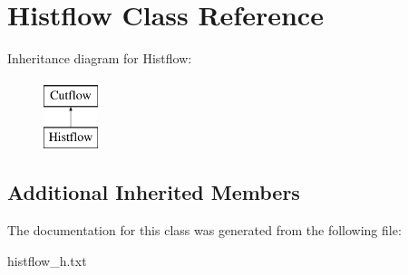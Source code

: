 \hypertarget{classHistflow}{}\section{Histflow Class Reference}
\label{classHistflow}
Inheritance diagram for Histflow\+:\begin{figure}[H]
\begin{center}
\leavevmode
\includegraphics[height=2.000000cm]{classHistflow}
\end{center}
\end{figure}
\subsection*{Additional Inherited Members}


The documentation for this class was generated from the following file\+:\begin{DoxyCompactItemize}
\item 
histflow\+\_\+h.\+txt\end{DoxyCompactItemize}
